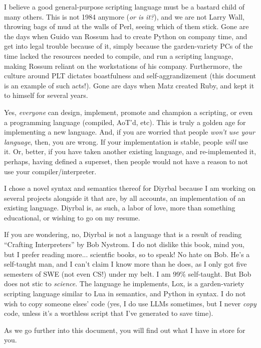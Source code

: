 \documentclass[a4paper,12pt]{article}
\newcommand{\nm}{Diyrbal\xspace}
\begin{document}
I believe a good general-purpose scripting language must be a bastard child of many others. This is not 1984 anymore (\textit{or is it?}), and we are not Larry Wall, throwing bags of mud at the walls of Perl, seeing which of them stick. Gone are the days when Guido van Rossum had to create Python on company time, and get into legal trouble because of it, simply because the garden-variety PCs of the time lacked the resources needed to compile, and run a scripting language, making Rossum reliant on the workstations of his company. Furthermore, the culture around PLT dictates boastfulness and self-aggrandizement (this document is an example of such acts!). Gone are days when Matz created Ruby, and kept it to himself for several years.

Yes, \textit{everyone} can design, implement, promote and champion a scripting, or even a programming language (compiled, AoT'd, etc). This is truly a golden age for implementing a new language. And, if you are worried that people \textit{won't use your language}, then, you are wrong. If your implementation is stable, people \textit{will} use it. Or, better, if you have taken another existing language, and re-implemented it, perhaps, having defined a superset, then people would not have a reason to not use your compiler/interpreter.

I chose a novel syntax and semantics thereof for \nm because I am working on several projects alongside it that are, by all accounts, an implementation of an existing language. \nm is, as such, a labor of love, more than something educational, or wishing to go on my resume.

If you are wondering, no, \nm is not a language that is a result of reading ``Crafting Interpreters'' by Bob Nystrom. I do not dislike this book, mind you, but I prefer reading more... scientfic books, so to speak! No hate on Bob. He's a self-taught man, and I can't claim I know more than he does, as I only got five semesters of SWE (not even CS!) under my belt. I am 99\% self-taught. But Bob does not stic to \textit{science}. The language he implements, Lox, is a garden-variety scripting language similar to Lua in semantics, and Python in syntax. I do not wish to copy someone elses' code (yes, I do use LLMs sometimes, but I never \textit{copy} code, unless it's a worthless script that I've generated to save time).

As we go further into this document, you will find out what I have in store for you.
\end{document}
